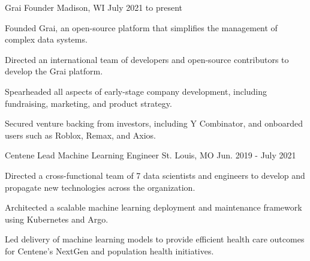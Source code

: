 

\begin{cventries}
    \cventry
        {Grai} %
        {Founder} %
        {Madison, WI} %
        {July 2021 to present} %
        {
        \begin{cvitems} %
            \item {Founded Grai, an open-source platform that simplifies the management of complex data systems.}
            \item {Directed an international team of developers and open-source contributors to develop the Grai platform.}
            \item {Spearheaded all aspects of early-stage company development, including fundraising, marketing, and product strategy.}
            \item {Secured venture backing from investors, including Y Combinator, and onboarded users such as Roblox, Remax, and Axios.}
        \end{cvitems}
        }
    
    \vspace{1em}

    \cventry
        {Centene} %
        {Lead Machine Learning Engineer} %
        {St. Louis, MO} %
        {Jun. 2019 - July 2021} %
        {
        \begin{cvitems} %
            \item {Directed a cross-functional team of 7 data scientists and engineers to develop and propagate new technologies across the organization.}
            \item {Architected a scalable machine learning deployment and maintenance framework using Kubernetes and Argo.}
            \item {Led delivery of machine learning models to provide efficient health care outcomes for Centene's NextGen and population health initiatives.}
        \end{cvitems}
        }
    

\end{cventries}
